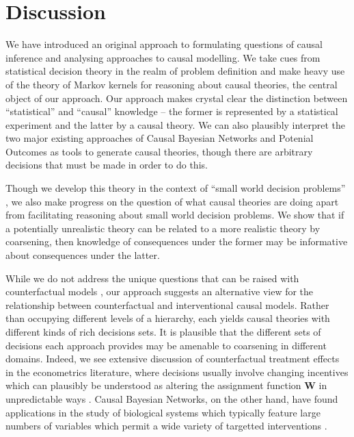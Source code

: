 
\section{Discussion}

We have introduced an original approach to formulating questions of causal inference and analysing approaches to causal modelling. We take cues from statistical decision theory in the realm of problem definition and make heavy use of the theory of Markov kernels for reasoning about causal theories, the central object of our approach. Our approach makes crystal clear the distinction between ``statistical'' and ``causal'' knowledge -- the former is represented by a statistical experiment and the latter by a causal theory. We can also plausibly interpret the two major existing approaches of Causal Bayesian Networks and Potenial Outcomes as tools to generate causal theories, though there are arbitrary decisions that must be made in order to do this.

Though we develop this theory in the context of ``small world decision problems'' \citep{joyce_foundations_1999}, we also make progress on the question of what causal theories are doing apart from facilitating reasoning about small world decision problems. We show that if a potentially unrealistic theory can be related to a more realistic theory by coarsening, then knowledge of consequences under the former may be informative about consequences under the latter. 

While we do not address the unique questions that can be raised with counterfactual models \citep{pearl_causality:_2009}, our approach suggests an alternative view for the relationship between counterfactual and interventional causal models. Rather than occupying different levels of a hierarchy, each yields causal theories with different kinds of rich decisions sets. It is plausible that the different sets of decisions each approach provides may be amenable to coarsening in different domains. Indeed, we see extensive discussion of counterfactual treatment effects in the econometrics literature, where decisions usually involve changing incentives which can plausibly be understood as altering the assignment function $\mathbf{W}$ in unpredictable ways \citep{angrist_mastering_2014,carneiro_evaluating_2010,imbens_identification_1994}. Causal Bayesian Networks, on the other hand, have found applications in the study of biological systems which typically feature large numbers of variables which permit a wide variety of targetted interventions \citep{sachs_causal_2005,maathuis_estimating_2009}.

